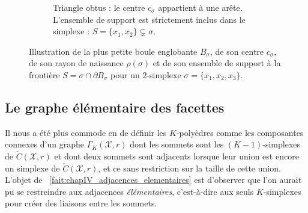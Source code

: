 \begin{figure}[!h]
\begin{subfigure}[b]{0.48\textwidth}
        \caption{Triangle obtus : le centre $c_\sigma$ appartient à une arête. L'ensemble de support est strictement inclus dans le simplexe : $S = \{x_1,x_2\} \subsetneq \sigma$.}
        \label{fig:support_obtusangle}
    \end{subfigure}
    \caption{Illustration de la plus petite boule englobante $B_\sigma$, de son centre $c_\sigma$, de son rayon de naissance $\rho(\sigma)$ et de son ensemble de support à la frontière $S = \sigma \cap \partial B_\sigma$ pour un $2$-simplexe $\sigma=\{x_1,x_2,x_3\}$.}
    \label{fig:illustrations_definitions_simplexe}
\end{figure}


\subsection{Le graphe élémentaire des facettes}

Il nous a été plus commode en  de définir les $K$-polyèdres comme les composantes connexes d'un graphe $\Gamma_K(\mathcal X,r)$ dont les sommets sont les $(K-1)$-simplexes de $\check C(\mathcal X,r)$ et dont deux sommets sont adjacents lorsque leur union est encore un simplexe de $\check C(\mathcal X,r)$, et ce sans restriction sur la taille de cette union. 
L'objet de \Fact~\ref{fait:chapIV_adjacences_elementaires} est d'observer que l'on aurait pu se restreindre aux adjacences \emph{élémentaires}, c'est-à-dire aux seuls $K$-simplexes pour créer des liaisons entre les sommets.


